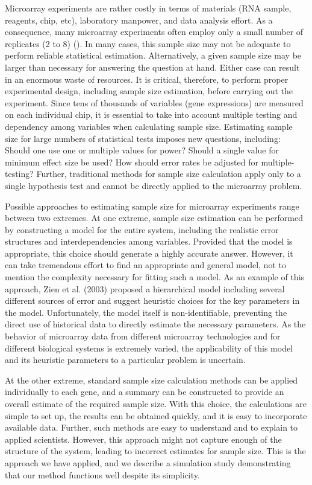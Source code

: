 \documentclass{bioinfo}
\begin{document}
Microarray experiments are rather costly in terms of materials (RNA
sample, reagents, chip, etc), laboratory manpower, and data analysis
effort.  As a consequence, many microarray experiments often employ
only a small number of replicates (2 to 8) (\citealp{Speed03}). In
many cases, this sample size may not be adequate to perform reliable
statistical estimation.  Alternatively, a given sample size may be
larger than necessary for answering the question at hand.  Either
case can result in an enormous waste of resources. It is critical,
therefore, to perform proper experimental design, including sample
size estimation, before carrying out the experiment. Since tens of
thousands of variables (gene expressions) are measured on each
individual chip, it is essential to take into account multiple
testing and dependency among variables when calculating sample size.
Estimating sample size for large numbers of statistical tests
imposes new questions, including: Should one use one or multiple
values for power? Should a single value for minimum effect size be
used?  How should error rates be adjusted for multiple-testing?
Further, traditional methods for sample size calculation apply only
to a single hypothesis test and cannot be directly applied to the
microarray problem.

Possible approaches to estimating sample size for microarray
experiments range between two extremes. At one extreme, sample size
estimation can be performed by constructing a model for the entire
system, including the realistic error structures and
interdependencies among variables. Provided that the model is
appropriate, this choice should generate a highly accurate answer.
However, it can take tremendous effort to find an appropriate and
general model, not to mention the complexity necessary for fitting
such a model. As an example of this approach, Zien et al. (2003)
proposed a hierarchical model including several different sources of
error and suggest heuristic choices for the key parameters in the
model. Unfortunately, the model itself is non-identifiable,
preventing the direct use of historical data to directly estimate
the necessary parameters.  As the behavior of microarray data from
different microarray technologies and for different biological
systems is extremely varied, the applicability of this model and its
heuristic parameters to a particular problem is uncertain.

At the other extreme, standard sample size calculation methods can
be applied individually to each gene, and a summary can be
constructed to provide an overall estimate of the required sample
size.  With this choice, the calculations are simple to set up,
the results can be obtained quickly, and it is easy to incorporate
available data. Further, such methods are easy to understand and
to explain to applied scientists.  However, this approach might
not capture enough of the structure of the system, leading to
incorrect estimates for sample size.  This is the approach we have
applied, and we describe a simulation study demonstrating that our
method functions well despite its simplicity.
\end{document}
